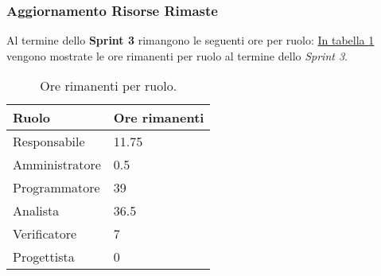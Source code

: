 \subsubsection{Aggiornamento Risorse Rimaste}
Al termine dello \textbf{Sprint 3} rimangono le seguenti ore per ruolo: \hyperref[tab:sprint3_ore_rimanenti]{In tabella \ref{tab:sprint3_ore_rimanenti}} vengono mostrate le ore rimanenti per ruolo al termine dello \textit{Sprint 3}.

\begin{table}[H]
    \centering
    \begin{tabular}{| l | l |}
    \hline
    \textbf{Ruolo} & 
    \textbf{Ore rimanenti}\\
    \hline
        Responsabile & 11.75\\
    \hline
        Amministratore & 0.5\\
    \hline
        Programmatore & 39\\
    \hline
        Analista & 36.5\\
    \hline
        Verificatore & 7\\
    \hline
        Progettista & 0\\
    \hline
    \end{tabular}
    \caption{Ore rimanenti per ruolo.}
    \label{tab:sprint3_ore_rimanenti} 
\end{table}
